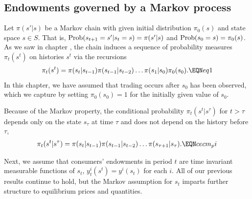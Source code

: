 \subsection{Endowments governed by a Markov process}
Let $\pi(s'|s)$ be a Markov chain with given initial distribution
$\pi_0(s)$ and state space $s\in S$.   That is, ${\rm
Prob}(s_{t+1}  = s' \vert
 s_t = s) =\pi(s'|s)$ and ${\rm Prob}  (s_0 = s) = \pi_0(s)$.
As we saw in chapter ,
 the chain induces a sequence of probability
measures $\pi_t(s^t)$  on histories $s^t$
via the recursions
$$ \pi_t(s^t) = \pi(s_t | s_{t-1}) \pi(s_{t-1} | s_{t-2}) \ldots
       \pi(s_1 | s_0)   \pi_0(s_0) . \EQN eq1  $$
In this chapter, we have assumed that trading occurs after $s_0$ has been observed,
which we capture by setting $\pi_0(s_0)=1$ for the initially
given value of $s_0$.

Because of the Markov property, the conditional probability
$\pi_t(s^t\vert s^\tau)$ for $t>\tau$ depends only on the state
$s_\tau$ at time $\tau$ and does not depend on the history
before $\tau$,
$$\pi_t(s^t|s^\tau) = \pi(s_t\vert s_{t-1}) \pi(s_{t-1} \vert s_{t-2})
          \ldots\pi(s_{\tau+1} \vert s_\tau).\EQN cecm_pi$$


Next, we assume that consumers' endowments in period $t$ are
time invariant measurable functions of $s_t$,
$y^i_t(s^t)=y^i(s_t)$ for each $i$. %
All of our
previous results continue to hold, but the Markov assumption
for $s_t$ imparts further structure to  equilibrium prices and quantities.


